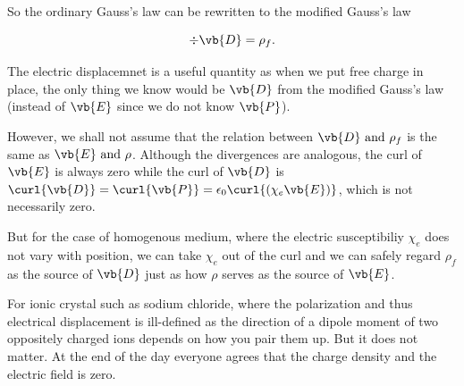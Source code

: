 \documentclass[english,a4paper,12pt]{report}
\begin{document}
So the ordinary Gauss's law can be rewritten to the modified Gauss's law

\begin{equation}
    \div{\vb{D} } = \rho _{f}. 
\end{equation}

The electric displacemnet is a useful quantity as when we put free charge in place, the only thing we know would be \(\vb{D} \) from the modified Gauss's law (instead of \(\vb{E} \) since we do not know \(\vb{P} \)).

However, we shall not assume that the relation between \(\vb{D} \text { and } \rho _{f} \) is the same as \(\vb{E} \text { and } \rho \). Although the divergences are analogous, the curl of \(\vb{E} \) is always zero while the curl of \(\vb{D} \) is \(\curl{\vb{D} } = \curl{\vb{P} } = \epsilon _{0}  \curl{(\chi _{e} \vb{E})}  \), which is not necessarily zero.

But for the case of homogenous medium, where the electric susceptibiliy \(\chi _{e} \) does not vary with position, we can take \(\chi _{e} \) out of the curl and we can safely regard \(\rho _{f} \) as the source of \(\vb{D} \) just as how \(\rho \) serves as the source of \(\vb{E} \).        

For ionic crystal such as sodium chloride, where the polarization and thus electrical displacement is ill-defined as the direction of a dipole moment of two oppositely charged ions depends on how you pair them up. But it does not matter. At the end of the day everyone agrees that the charge density and the electric field is zero.  
\end{document}
